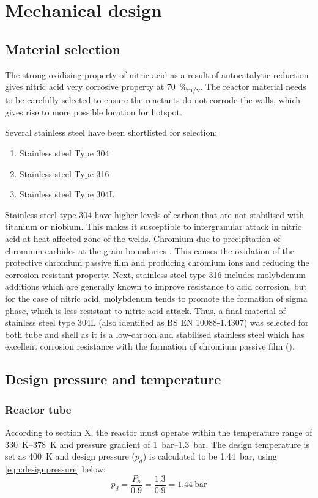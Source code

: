 \section{Mechanical design}
\subsection{Material selection}
The strong oxidising property of nitric acid as a result of autocatalytic reduction \cite{suresh_corrosion_nodate} gives nitric acid very corrosive property at \SI{70}{\%_{m/v}}. The reactor material needs to be carefully selected to ensure the reactants do not corrode the walls, which gives rise to more possible location for hotspot.

Several stainless steel have been shortlisted for selection: 
\begin{enumerate}
    \item Stainless steel Type 304
    \item Stainless steel Type 316
    \item Stainless steel Type 304L
\end{enumerate}

Stainless steel type 304 have higher levels of carbon that are not stabilised with titanium or niobium. This makes it susceptible to intergranular attack in nitric acid at heat affected zone of the welds. Chromium due to precipitation of chromium carbides at the grain boundaries \cite{cm_selection_nodate}. This causes the oxidation of the protective chromium passive film and producing chromium ions  and reducing the corrosion resistant property. Next, stainless steel type 316 includes molybdenum additions which are generally known to improve resistance to acid corrosion, but for the case of nitric acid, molybdenum tends to promote the formation of sigma phase, which is less resistant to nitric acid attack. Thus, a final material of stainless steel type 304L (also identified as BS EN 10088-1.4307) was selected for both tube and shell as it is a low-carbon and stabilised stainless steel which has excellent corrosion resistance with the formation of chromium passive film ().

\subsection{Design pressure and temperature}
\subsubsection{Reactor tube}
According to section X, the reactor must operate within the temperature range of \SIrange{330}{378}{\K} and pressure gradient of \SIrange{1}{1.3}{\bar}. The design temperature is set as \SI{400}{\K} and design pressure ($p_d$) is calculated to be \SI{1.44}{\bar}, using \cref{eqn:designpressure} below:
\begin{equation}
    p_d = \frac{P_o}{0.9} = \frac{1.3}{0.9} = \SI{1.44}{\bar}
    \label{eqn:designpressure}
\end{equation}


